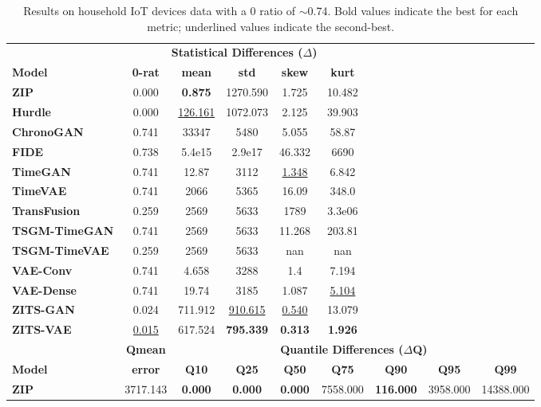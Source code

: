 \documentclass[make,article,submit,moreauthors]{Definitions/mdpi}
\begin{document}
\begin{table}[htbp]
\centering
\caption{Results on household IoT devices data with a 0 ratio of $\sim$0.74. Bold values indicate the best for each metric; underlined values indicate the second-best.}
\label{tab:iot_results}
\setlength{\tabcolsep}{2.2pt}
\renewcommand{\arraystretch}{1.0}
\begin{tabular}{l cccccccc}
\toprule
& \multicolumn{5}{c}{\textbf{Statistical Differences ($\Delta$)}} & & & \\
\cmidrule(lr){2-6}
\textbf{Model} & \textbf{0-rat} & \textbf{mean} & \textbf{std} & \textbf{skew} & \textbf{kurt} & & & \\
\midrule
\textbf{ZIP}          & 0.000 & \textbf{0.875} & 1270.590 & 1.725 & 10.482 & & & \\
\textbf{Hurdle}       & 0.000 & \underline{126.161} & 1072.073 & 2.125 & 39.903 & & & \\
\textbf{ChronoGAN}    & 0.741 & 33347 & 5480 & 5.055 & 58.87 & & & \\
\textbf{FIDE}         & 0.738 & 5.4e15 & 2.9e17 & 46.332 & 6690 & & & \\
\textbf{TimeGAN}      & 0.741 & 12.87 & 3112 & \underline{1.348} & 6.842 & & & \\
\textbf{TimeVAE}      & 0.741 & 2066 & 5365 & 16.09 & 348.0 & & & \\
\textbf{TransFusion}  & 0.259 & 2569 & 5633 & 1789 & 3.3e06 & & & \\
\textbf{TSGM-TimeGAN} & 0.741 & 2569 & 5633 & 11.268 & 203.81 & & & \\
\textbf{TSGM-TimeVAE} & 0.259 & 2569 & 5633 & nan & nan & & & \\
\textbf{VAE-Conv}     & 0.741 & 4.658 & 3288 & 1.4 & 7.194 & & & \\
\textbf{VAE-Dense}    & 0.741 & 19.74 & 3185 & 1.087 & \underline{5.104} & & & \\
\textbf{ZITS-GAN}     & 0.024 & 711.912 & \underline{910.615} & \underline{0.540} & 13.079 & & & \\
\textbf{ZITS-VAE}     & \underline{0.015} & 617.524 & \textbf{795.339} & \textbf{0.313} & \textbf{1.926} & & & \\
\midrule
& \textbf{Qmean} & \multicolumn{7}{c}{\textbf{Quantile Differences ($\Delta$Q)}} \\
\cmidrule(lr){3-9}
\textbf{Model} & \textbf{error} & \textbf{Q10} & \textbf{Q25} & \textbf{Q50} & \textbf{Q75} & \textbf{Q90} & \textbf{Q95} & \textbf{Q99} \\
\midrule
\textbf{ZIP}          & 3717.143 & \textbf{0.000} & \textbf{0.000} & \textbf{0.000} & 7558.000 & \textbf{116.000} & 3958.000 & 14388.000 \\

\end{tabular}
\end{table}
\end{document}
